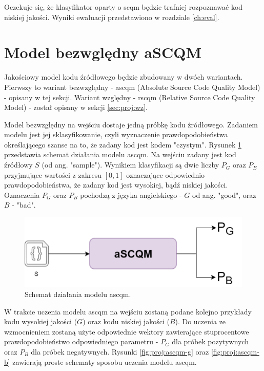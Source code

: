 \documentclass[12pt]{report}
\begin{document}
Oczekuje się, że klasyfikator oparty o \gls{scqm} będzie trafniej rozpoznawać kod niskiej jakości. Wyniki ewaluacji przedstawiono w rozdziale \ref{ch:eval}.

\section{Model bezwględny aSCQM}
\label{sec:proj:bz}
Jakościowy model kodu źródłowego będzie zbudowany w dwóch wariantach. Pierwszy to wariant bezwzględny - \gls{ascqm} (Absolute Source Code Quality Model) - opisany w tej sekcji. Wariant względny - \gls{rscqm} (Relative Source Code Quality Model) - został opisany w sekcji \ref{sec:proj:wz}.

Model bezwzględny na wejściu dostaje jedną próbkę kodu źródłowego. Zadaniem modelu jest jej sklasyfikowanie, czyli wyznaczenie prawdopodobieństwa określającego szanse na to, że zadany kod jest kodem "czystym". Rysunek \ref{fig:proj:ascqm-s} przedstawia schemat działania modelu \gls{ascqm}. Na wejściu zadany jest kod źródłowy $S$ (od ang. "sample"). Wynikiem klasyfikacji są dwie liczby $P_G$ oraz $P_B$ przyjmujące wartości z zakresu $[0,1]$ oznaczające odpowiednio prawdopodobieństwa, że zadany kod jest wysokiej, bądź niskiej jakości. Oznaczenia $P_G$ oraz $P_B$ pochodzą z języka angielskiego - $G$ od ang. "good", oraz $B$ - "bad".

\begin{figure}
\centering
\includegraphics[width=\textwidth]{proj/ascqm-s.png}
\caption{Schemat działania modelu \gls{ascqm}.}
\label{fig:proj:ascqm-s}
\end{figure}

W trakcie uczenia modelu \gls{ascqm} na wejściu zostaną podane kolejno przykłady kodu wysokiej jakości ($G$) oraz kodu niskiej jakości ($B$). Do uczenia ze wzmocnieniem zostaną użyte odpowiednie wektory zawierające stuprocentowe prawdopodobieństwo odpowiedniego parametru - $P_G$ dla próbek pozytywnych oraz $P_B$ dla próbek negatywnych. Rysunki \ref{fig:proj:ascqm-g} oraz \ref{fig:proj:ascqm-b} zawierają proste schematy sposobu uczenia modelu \gls{ascqm}.
\end{document}
